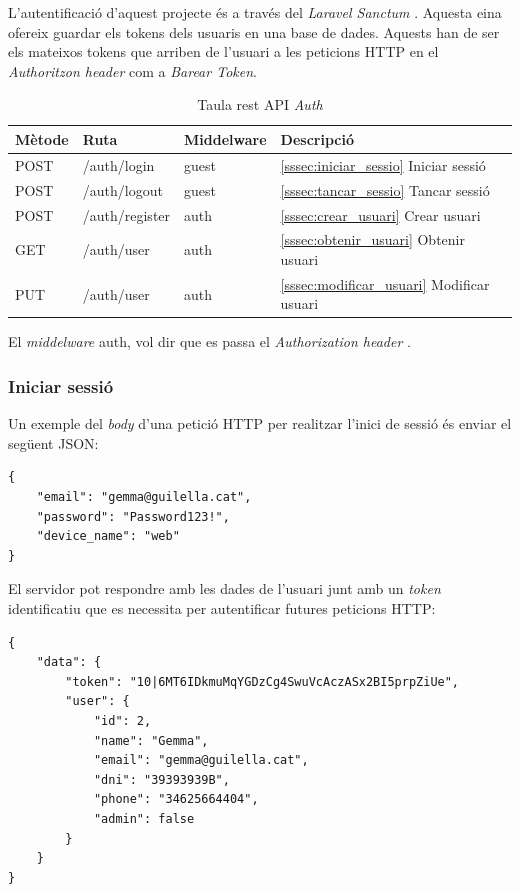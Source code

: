 L'autentificació d'aquest projecte és a través del \emph{Laravel Sanctum} \autocite{sanctum_laravel}.
Aquesta eina ofereix guardar els tokens dels usuaris en una base de dades. Aquests han de ser els
mateixos tokens que arriben de l'usuari a les peticions HTTP  en el \emph{Authoritzon header} com a
\emph{Barear Token}.

\begin{table}[H]
\centering
\begin{tabular}{llll}
\hline
\textbf{Mètode} & \textbf{Ruta} & \textbf{Middelware} & \textbf{Descripció} \\ \hline
POST            & /auth/login     & guest &  \autoref{sssec:iniciar_sessio}{ Iniciar sessió}     \\ \hline
POST            & /auth/logout    & guest &  \autoref{sssec:tancar_sessio}{ Tancar sessió}     \\ \hline
POST            & /auth/register  & auth  &  \autoref{sssec:crear_usuari}{ Crear usuari}    \\ \hline
GET             & /auth/user      & auth  &  \autoref{sssec:obtenir_usuari}{ Obtenir usuari}    \\ \hline
PUT             & /auth/user      & auth  &  \autoref{sssec:modificar_usuari}{ Modificar usuari}  \\ \hline
\end{tabular}
\caption{Taula rest API \emph{Auth}}
\label{tab:my-auth-api-table}
\end{table}

El \emph{middelware} auth, vol dir que es passa el \emph{Authorization header} \autocite{middleware_laravel}.

\subsubsection{Iniciar sessió}
\label{sssec:iniciar_sessio}

Un exemple del \emph{body} d'una petició HTTP per realitzar l'inici de sessió és enviar
el següent JSON:

\begin{verbatim}
{
    "email": "gemma@guilella.cat",
    "password": "Password123!",
    "device_name": "web"
}
\end{verbatim}

El servidor pot respondre amb les dades de l'usuari junt amb un \emph{token} identificatiu que es necessita per
autentificar futures peticions HTTP:
\begin{verbatim}
{
    "data": {
        "token": "10|6MT6IDkmuMqYGDzCg4SwuVcAczASx2BI5prpZiUe",
        "user": {
            "id": 2,
            "name": "Gemma",
            "email": "gemma@guilella.cat",
            "dni": "39393939B",
            "phone": "34625664404",
            "admin": false
        }
    }
}
\end{verbatim}


